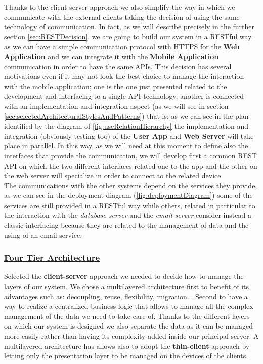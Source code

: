 			Thanks to the client-server approach we also simplify the way in which we communicate with the external clients taking the decision of using the same technology of communication. In fact, as we will describe precisely in the further section \ref{sec:RESTDecision}, we are going to build our system in a RESTful way as we can have a simple communication protocol with HTTPS for the \textbf{Web Application} and we can integrate it with the \textbf{Mobile Application} communication in order to have the same APIs. This decision has several motivations even if it may not look the best choice to manage the interaction with the mobile application; one is the one just presented related to the development and interfacing to a single API technology, another is connected with an implementation and integration aspect (as we will see in section \ref{sec:selectedArchitecturalStylesAndPatterns}) that is: as we can see in the plan identified by the diagram of \autoref{fig:useRelationHierarchy} the implementation and integration (obviously testing too) of the \textbf{User App} and \textbf{Web Server} will take place in parallel. In this way, as we will need at this moment to define also the interfaces that provide the communication, we will develop first a common REST API on which the two different interfaces related one to the app and the other on the web server will specialize in order to connect to the related device.\\
			
			 The communications with the other systems depend on the services they provide, as we can see in the deployment diagram (\autoref{fig:deploymentDiagram}) some of the services are still provided in a RESTful way while others, related in particular to the interaction with the \emph{database server} and the \emph{email server} consider instead a classic interfacing because they are related to the management of data and the using of an email service.
			
		\subsubsection[Four Tier Architecture]{\hyperlink{toc}{Four Tier Architecture}}
			\label{sec:fourTierArchitectureDecision}
			
			Selected the \textbf{client-server} approach we needed to decide how to manage the layers of our system. We chose a multilayered architecture first to benefit of its advantages such as: decoupling, reuse, flexibility, migration... Second to have a way to realize a centralized business logic that allows to manage all the complex management of the data we need to take care of. Thanks to the different layers on which our system is designed we also separate the data as it can be managed more easily rather than having its complexity added inside our principal server. A multilayered architecture has allows also to adopt the \textbf{thin-client} approach by letting only the presentation layer to be managed on the devices of the clients.\\
			
